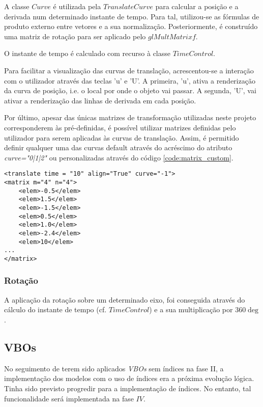 \documentclass[relatorio.tex]{subfiles}
\begin{document}
A classe $Curve$ é utilizada pela $TranslateCurve$ para calcular 
a posição e a derivada num determinado instante de tempo.
Para tal, utilizou-se as fórmulas de produto externo entre vetores e 
a sua normalização.
Posteriormente, é construído uma matriz de rotação para ser aplicado pelo 
$glMultMatrixf$.

O instante de tempo é calculado com recurso à classe $TimeControl$.

Para facilitar a visualização das curvas de translação, acrescentou-se 
a interação com o utilizador através das teclas 'u' e 'U'.
A primeira, 'u', ativa a renderização da curva de posição, i.e.
o local por onde o objeto vai passar.
A segunda, 'U', vai ativar a renderização das linhas de derivada em cada posição.

Por último, apesar das únicas matrizes de transformação utilizadas neste projeto corresponderem
às pré-definidas, é possível utilizar matrizes definidas pelo utilizador 
para serem aplicadas às curvas de translação.
Assim, é permitido definir qualquer uma das curvas default através 
do acréscimo do atributo \textit{curve="0|1|2"} ou personalizadas
através do código \ref{code:matrix_custom}.
\begin{code}
\label{code:matrix_custom}
\begin{verbatim}
<translate time = "10" align="True" curve="-1"> 
<matrix m="4" n="4">
    <elem>-0.5</elem>
    <elem>1.5</elem>
    <elem>-1.5</elem>
    <elem>0.5</elem>
    <elem>1.0</elem>
    <elem>-2.4</elem>
    <elem>10</elem>
...
</matrix>
\end{verbatim}
\end{code}

\subsubsection{Rotação} \label{subsub:rot}
A aplicação da rotação sobre um determinado eixo, foi conseguida através do cálculo 
do instante de tempo (cf. $TimeControl$) e a sua multiplicação por 
$360\deg$.

\subsection{VBOs} \label{subsec:VBO}
No seguimento de terem sido aplicados \textit{VBOs} sem índices na fase II, a implementação dos 
modelos com o uso de índices era a próxima evolução lógica. 
Tinha sido previsto progredir para a implementação de índices.
No entanto, tal funcionalidade será implementada na fase $IV$.
\end{document}
